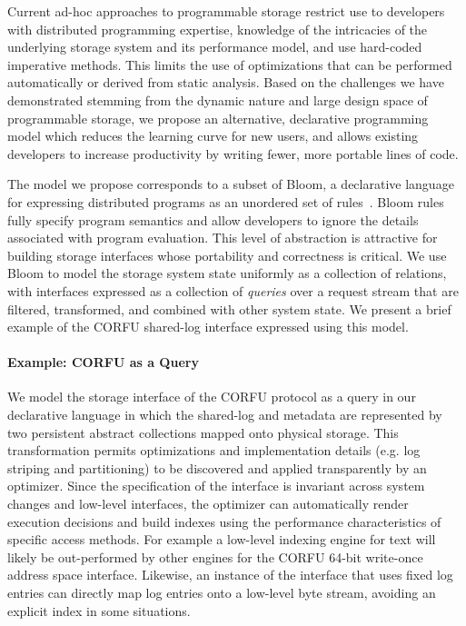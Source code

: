 Current ad-hoc approaches to programmable storage restrict
use to developers with distributed programming expertise, knowledge of the
intricacies of the underlying storage system and its performance model, and
use hard-coded imperative methods. This limits the use of optimizations that
can be performed automatically or derived from static analysis.  Based on the
challenges we have demonstrated stemming from the dynamic nature and large
design space of programmable storage, we propose an alternative, declarative
programming model which reduces the learning curve for new users, and allows
existing developers to increase productivity by writing fewer, more portable lines of code.

The model we propose corresponds to a subset of Bloom, a
declarative language for expressing distributed programs as an unordered set
of rules~\cite{alvaro:cidr11}. Bloom rules fully specify program semantics and
allow developers to ignore the details associated with program
evaluation. This level of abstraction is attractive for building storage
interfaces whose portability and correctness is critical. We use Bloom to model the
storage system state uniformly as a collection of relations, with interfaces
expressed as a collection of \emph{queries} over a request stream that
are filtered, transformed, and combined with other system state. We present a
brief example of the CORFU shared-log interface expressed using this model.

\paragraph*{Example: CORFU as a Query}

We model the storage interface of the CORFU protocol as a query in our
declarative language in which the shared-log and metadata are represented by
two persistent abstract collections mapped onto physical storage. This
transformation permits optimizations and implementation details (e.g. log
striping and partitioning) to be discovered and applied transparently by an
optimizer.  Since the specification of the interface is invariant across
system changes and low-level interfaces, the optimizer can automatically
render execution decisions and build indexes using the performance
characteristics of specific access methods.  For example a low-level indexing
engine for text will likely be out-performed by other engines for the CORFU
64-bit write-once address space interface.  Likewise, an instance of the
interface that uses fixed log entries can directly map log entries onto a
low-level byte stream, avoiding an explicit index in some situations.

